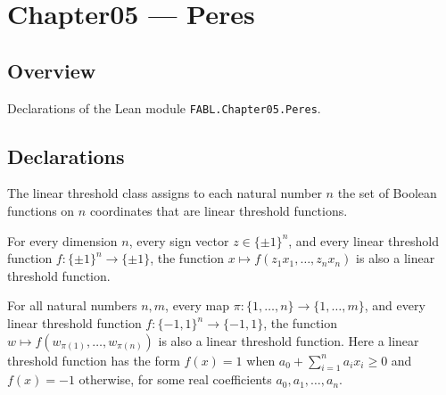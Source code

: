 \chapter{Chapter05 — Peres}
\section{Overview}

Declarations of the Lean module \texttt{FABL.Chapter05.Peres}.

\section{Declarations}

\begin{definition}
\label{FABL.linearThresholdClass}
\leanok
{}
The linear threshold class assigns to each natural number $n$ the set of Boolean
functions on $n$ coordinates that are linear threshold functions.
\end{definition}

\begin{theorem}
\label{FABL.linearThresholdClass_closedUnderNegatingInputVariables}
\leanok
{}
For every dimension $n$, every sign vector $z\in\{\pm1\}^n$, and every linear threshold
function $f:\{\pm1\}^n\to\{\pm1\}$, the function $x\mapsto f(z_1x_1,\ldots,z_nx_n)$ is
also a linear threshold function.
\end{theorem}

\begin{theorem}
\label{FABL.linearThresholdClass_closedUnderIdentifyingInputVariables}
\leanok
{}
For all natural numbers $n,m$, every map $\pi:\{1,\ldots,n\}\to\{1,\ldots,m\}$, and
every linear threshold function $f:\{-1,1\}^n\to\{-1,1\}$, the function $w\mapsto
f(w_{\pi(1)},\ldots,w_{\pi(n)})$ is also a linear threshold function. Here a linear
threshold function has the form $f(x)=1$ when $a_0+\sum_{i=1}^n a_ix_i\ge 0$ and
$f(x)=-1$ otherwise, for some real coefficients $a_0,a_1,\ldots,a_n$.
\end{theorem}

